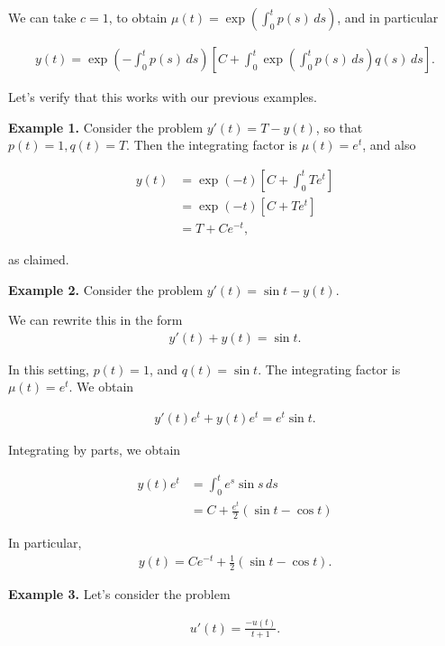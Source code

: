 \documentclass{article}
\begin{document}
We can take $c = 1$, to obtain $\mu(t) = \exp \left( \int_{0}^{t} p(s) \, ds \right)$, and in particular

\begin{align*}
  y(t) = \exp \left( - \int_{0}^{t} p(s) \, ds \right) \left[ C + \int_{0}^{t} \exp \left( \int_{0}^{t} p(s) \, ds \right) q(s) \, ds \right].
\end{align*}


Let's verify that this works with our previous examples.

{\bf Example 1.} Consider the problem $y'(t) = T - y(t)$, so that $p(t) = 1, q(t) = T$.  Then the integrating factor is  $\mu(t) = e^{t}$, and also

\begin{align*}
  y(t) &= \exp (-t) \left[ C + \int_{0}^{t} T e^{t} \right] \\
  &= \exp(-t) \left[ C + T e^{t} \right] \\
  &= T + C e^{-t},
\end{align*}

as claimed.

{\bf Example 2.} Consider the problem $y'(t) = \sin t - y(t)$.

We can rewrite this in the form
\begin{align*}
  y'(t) + y(t) = \sin t.
\end{align*}

In this setting, $p(t) = 1$, and $q(t) = \sin t$.  The integrating factor is $\mu(t) = e^{t}$.  We obtain  

\begin{align*}
  y'(t) e^{t} + y(t) e^t = e^t \sin t.
\end{align*}

Integrating by parts, we obtain

\begin{align*}
  y(t) e^{t} &= \int_{0}^{t} e^s \sin s \, ds \\
  &= C + \frac{e^t}{2} \left( \sin t - \cos t \right)
\end{align*}

In particular,
\begin{align*}
  y(t) = C e^{-t} + \frac{1}{2} \left( \sin t - \cos t \right).
\end{align*}

{\bf Example 3.} Let's consider the problem

\begin{align*}
  u'(t) = \frac{- u(t)}{t+1}.
\end{align*}
\end{document}
